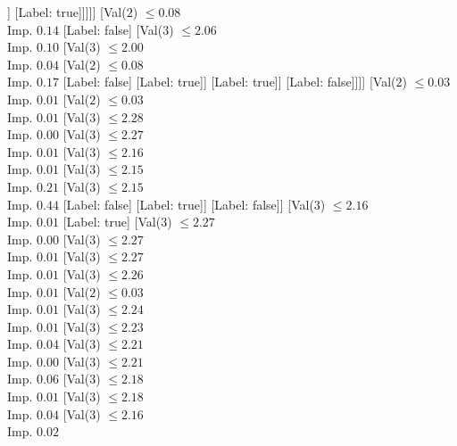 \documentclass[margin=10pt]{standalone}
\begin{document}
\begin{forest}
								[Label: false]
								[Val($2$) $ \leq 0.08$ \\ Imp. $0.01$
									[Val($2$) $ \leq 0.08$ \\ Imp. $0.28$
										[Label: true]
										[Label: false]]
									[Label: true]]]]]
					[Val($2$) $ \leq 0.08$ \\ Imp. $0.14$
						[Label: false]
						[Val($3$) $ \leq 2.06$ \\ Imp. $0.10$
							[Val($3$) $ \leq 2.00$ \\ Imp. $0.04$
								[Val($2$) $ \leq 0.08$ \\ Imp. $0.17$
									[Label: false]
									[Label: true]]
								[Label: true]]
							[Label: false]]]]
				[Val($2$) $ \leq 0.03$ \\ Imp. $0.01$
					[Val($2$) $ \leq 0.03$ \\ Imp. $0.01$
						[Val($3$) $ \leq 2.28$ \\ Imp. $0.00$
							[Val($3$) $ \leq 2.27$ \\ Imp. $0.01$
								[Val($3$) $ \leq 2.16$ \\ Imp. $0.01$
									[Val($3$) $ \leq 2.15$ \\ Imp. $0.21$
										[Val($3$) $ \leq 2.15$ \\ Imp. $0.44$
											[Label: false]
											[Label: true]]
										[Label: false]]
									[Val($3$) $ \leq 2.16$ \\ Imp. $0.01$
										[Label: true]
										[Val($3$) $ \leq 2.27$ \\ Imp. $0.00$
											[Val($3$) $ \leq 2.27$ \\ Imp. $0.01$
												[Val($3$) $ \leq 2.27$ \\ Imp. $0.01$
													[Val($3$) $ \leq 2.26$ \\ Imp. $0.01$
														[Val($2$) $ \leq 0.03$ \\ Imp. $0.01$
															[Val($3$) $ \leq 2.24$ \\ Imp. $0.01$
																[Val($3$) $ \leq 2.23$ \\ Imp. $0.04$
																	[Val($3$) $ \leq 2.21$ \\ Imp. $0.00$
																		[Val($3$) $ \leq 2.21$ \\ Imp. $0.06$
																			[Val($3$) $ \leq 2.18$ \\ Imp. $0.01$
																				[Val($3$) $ \leq 2.18$ \\ Imp. $0.04$
																					[Val($3$) $ \leq 2.16$ \\ Imp. $0.02$

\end{forest}
\end{document}
